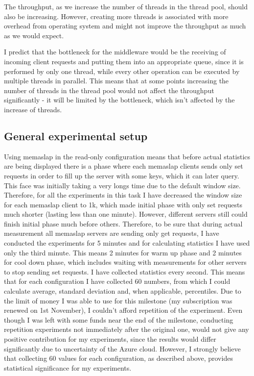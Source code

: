 \documentclass[11pt]{article}
\begin{document}
The throughput, as we increase the number of threads in the thread pool, should also be increasing. However, creating more threads is associated with more overhead from operating system and might not improve the throughput as much as we would expect. 

I predict that the bottleneck for the middleware would be the receiving of incoming client requests and putting them into an appropriate queue, since it is performed by only one thread, while every other operation can be executed by multiple threads in parallel. This means that at some points increasing the number of threads in the thread pool would not affect the throughput significantly - it will be limited by the bottleneck, which isn't affected by the increase of threads.

\subsection{General experimental setup}
Using memaslap in the read-only configuration means that before actual statistics are being displayed there is a phase where each memaslap clients sends only set requests in order to fill up the server with some keys, which it can later query. This face was initially taking a very longs time due to the default window size. Therefore, for all the experiments in this task I have decreased the window size for each memaslap client to 1k, which made initial phase with only set requests much shorter (lasting less than one minute). However, different servers still could finish initial phase much before others. Therefore, to be sure that during actual measurement all memaslap servers are sending only get requests, I have conducted the experiments for 5 minutes and for calculating statistics I have used only the third minute. This means 2 minutes for warm up phase and 2 minutes for cool down phase, which includes waiting with measurements for other servers to stop sending set requests. I have collected statistics every second. This means that for each configuration I have collected 60 numbers, from which I could calculate average, standard deviation and, when applicable, percentiles. Due to the limit of money I was able to use for this milestone (my subscription was renewed on 1st November), I couldn't afford repetition of the experiment. Even though I was left with some funds near the end of the milestone, conducting repetition experiments not immediately after the original one, would not give any positive contribution for my experiments, since the results would differ significantly due to uncertainty of the Azure cloud. However, I strongly believe that collecting 60 values for each configuration, as described above, provides statistical significance for my experiments.   
\end{document}
